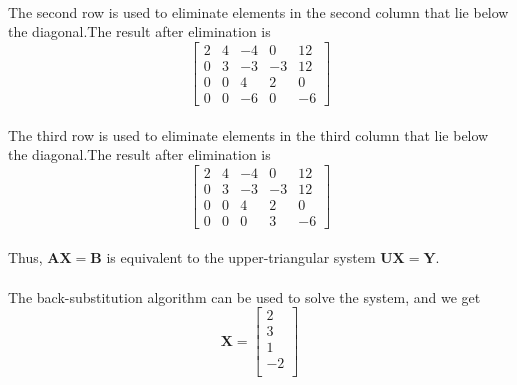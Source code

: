 \documentclass{article}  %
\begin{document}
        \paragraph{}The second row is used to eliminate elements in the second column that lie below the
        diagonal.The result after elimination is
        \begin{equation*}       %
            \left[                 %
              \begin{array}{rrrr|r}   %
                2 & 4 & -4 & 0 & 12 \\
                0 & 3 & -3 & -3 & 12 \\
                0 & 0 & 4 & 2 & 0 \\
                0 & 0 & -6 & 0 & -6
              \end{array}
            \right]                 %
        \end{equation*}
        \paragraph{}The third row is used to eliminate elements in the third column that lie below the
        diagonal.The result after elimination is
        \begin{equation*}       %
            \left[                 %
              \begin{array}{rrrr|r}   %
                2 & 4 & -4 & 0 & 12 \\
                0 & 3 & -3 & -3 & 12 \\
                0 & 0 & 4 & 2 & 0 \\
                0 & 0 & 0 & 3 & -6
              \end{array}
            \right]                 %
        \end{equation*}
        \paragraph{}Thus, $\bm{AX = B}$ is equivalent to the upper-triangular system $\bm{UX = Y}$.
        \paragraph{}The back-substitution algorithm can be used to solve the system, and we get
        \begin{equation*}       %
            \bm{X=}  \left[                 %
              \begin{array}{r}   %
                2 \\ %
                3 \\  %
                1 \\ 
                -2 \\
              \end{array}
            \right]                 %
        \end{equation*}
\end{document}
